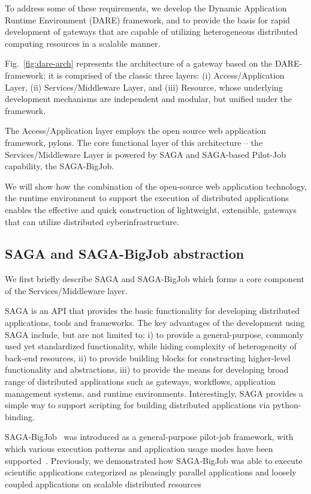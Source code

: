 \documentclass{sig-alternate}
\begin{document}
To address some of these requirements, we develop the Dynamic
Application Runtime Environment (DARE) framework\cite{dareurl}, 
and to provide the basis for rapid development of gateways that
are capable of utilizing heterogeneous distributed computing resources
in a scalable manner.

Fig.~\ref{fig:dare-arch} represents the architecture of a gateway
based on the DARE-framework; it is comprised of the classic three layers: (i)
Access/Application Layer, (ii) Services/Middleware Layer, and
(iii) Resource, whose underlying development mechanisms are
independent and modular, but unified under the framework. 

The Access/Application layer employs the open source web application
framework, pylons\cite{pylonsurl}.  The core functional layer of this
architecture -- the Services/Middleware Layer is powered by SAGA and
SAGA-based Pilot-Job capability, the
SAGA-BigJob\cite{saga-ccgrid10}. %

We will show how the combination of the open-source web application
technology, the runtime environment to support the execution of
distributed applications enables the effective and quick construction
of lightweight, extensible, gateways that can utilize
distributed cyberinfrastructure. 


\subsection{SAGA and SAGA-BigJob abstraction}

We first briefly describe SAGA and SAGA-BigJob which forms a core
component of the Services/Middleware layer.
 
SAGA is an API that provides the basic functionality for developing
distributed applications, tools and frameworks\cite{saga_url}. The key
advantages of the development using SAGA include, but are not limited
to: i) to provide a general-purpose, commonly used yet standardized
functionality, while hiding complexity of heterogeneity of back-end
resources, ii) to provide building blocks for constructing
higher-level functionality and abstractions, iii) to provide the means
for developing broad range of distributed applications such as
gateways, workflows, application management systems, and runtime
environments.  Interestingly, SAGA provides a simple way to support
scripting for building distributed applications via python-binding.

SAGA-BigJob~\cite{saga-ccgrid10} was introduced as a general-purpose
pilot-job framework, with which various execution patterns and
application usage modes have been
supported~\cite{async_repex11,saga-royalsoc}.  Previously, we
demonstrated how SAGA-BigJob was able to execute scientific
applications categorized as pleasingly parallel applications and
loosely coupled applications on scalable distributed
resources\cite{jha2009developing, ecmls10, ecmls11}
\end{document}
